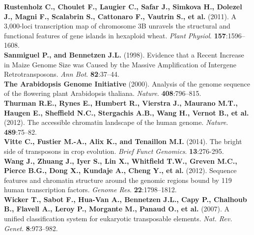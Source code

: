 \documentclass[a4paper, 12pt]{article}
\begin{document}
\begin{onehalfspace}
\begin{flushleft}
\vspace{0.3cm}
\textbf{Rustenholz C., Choulet F., Laugier C., Safar J., Simkova H., Dolezel J., Magni F., Scalabrin S., Cattonaro F., Vautrin S., et al.} (2011). A 3,000-loci transcription map of chromosome 3B unravels the structural and functional features of gene islands in hexaploid wheat. \textit{Plant Physiol}. \textbf{157}:1596–1608.\\
\vspace{0.3cm}
\textbf{Sanmiguel P., and Bennetzen J.L.} (1998). Evidence that a Recent Increase in Maize Genome Size was Caused by the Massive Amplification of Intergene Retrotransposons. \textit{Ann Bot}. \textbf{82}:37–44.\\
\vspace{0.3cm}
\textbf{The Arabidopsis Genome Initiative} (2000). Analysis of the genome sequence of the flowering plant Arabidopsis thaliana. \textit{Nature}. \textbf{408}:796–815.\\
\vspace{0.3cm}
\textbf{Thurman R.E., Rynes E., Humbert R., Vierstra J., Maurano M.T., Haugen E., Sheffield N.C., Stergachis A.B., Wang H., Vernot B., et al.} (2012). The accessible chromatin landscape of the human genome. \textit{Nature}. \textbf{489}:75–82.\\
\vspace{0.3cm}
\textbf{Vitte C., Fustier M.-A., Alix K., and Tenaillon M.I.} (2014). The bright side of transposons in crop evolution. \textit{Brief Funct Genomics}. \textbf{13}:276-295.\\
\vspace{0.3cm}
\textbf{Wang J., Zhuang J., Iyer S., Lin X., Whitfield T.W., Greven M.C., Pierce B.G., Dong X., Kundaje A., Cheng Y., et al.} (2012). Sequence features and chromatin structure around the genomic regions bound by 119 human transcription factors. \textit{Genome Res}. \textbf{22}:1798–1812.\\
\vspace{0.3cm}
\textbf{Wicker T., Sabot F., Hua-Van A., Bennetzen J.L., Capy P., Chalhoub B., Flavell A., Leroy P., Morgante M., Panaud O., et al.} (2007). A unified classification system for eukaryotic transposable elements. \textit{Nat. Rev. Genet}. \textbf{8}:973–982.
\end{flushleft}

\newpage
\thispagestyle{empty}
\null



\end{onehalfspace}
\end{document}
